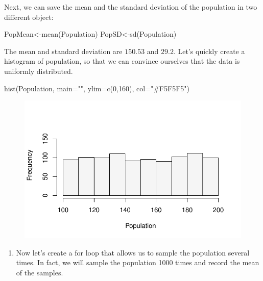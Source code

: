 \documentclass[
  letterpaper,
  DIV=11,
  numbers=noendperiod]{scrreprt}
\newenvironment{Shaded}{\begin{snugshade}}{\end{snugshade}}
\newcommand{\AttributeTok}[1]{\textcolor[rgb]{0.40,0.45,0.13}{#1}}
\newcommand{\DecValTok}[1]{\textcolor[rgb]{0.68,0.00,0.00}{#1}}
\newcommand{\FunctionTok}[1]{\textcolor[rgb]{0.28,0.35,0.67}{#1}}
\newcommand{\NormalTok}[1]{\textcolor[rgb]{0.00,0.23,0.31}{#1}}
\newcommand{\OtherTok}[1]{\textcolor[rgb]{0.00,0.23,0.31}{#1}}
\newcommand{\StringTok}[1]{\textcolor[rgb]{0.13,0.47,0.30}{#1}}
\providecommand{\tightlist}{%
  \setlength{\itemsep}{0pt}\setlength{\parskip}{0pt}}\usepackage{longtable,booktabs,array}
\begin{document}
Next, we can save the mean and the standard deviation of the population
in two different object:

\begin{Shaded}
\begin{Highlighting}[numbers=left,,]
\NormalTok{PopMean}\OtherTok{\textless{}{-}}\FunctionTok{mean}\NormalTok{(Population)}
\NormalTok{PopSD}\OtherTok{\textless{}{-}}\FunctionTok{sd}\NormalTok{(Population)}
\end{Highlighting}
\end{Shaded}

The mean and standard deviation are \(150.53\) and \(29.2\). Let's
quickly create a histogram of population, so that we can convince
ourselves that the data is uniformly distributed.

\begin{Shaded}
\begin{Highlighting}[numbers=left,,]
\FunctionTok{hist}\NormalTok{(Population, }\AttributeTok{main=}\StringTok{""}\NormalTok{, }\AttributeTok{ylim=}\FunctionTok{c}\NormalTok{(}\DecValTok{0}\NormalTok{,}\DecValTok{160}\NormalTok{), }\AttributeTok{col=}\StringTok{"\#F5F5F5"}\NormalTok{)}
\end{Highlighting}
\end{Shaded}

\begin{figure}[H]

{\centering \includegraphics{./12-InferenceI_files/figure-pdf/unnamed-chunk-3-1.pdf}

}

\end{figure}

\begin{enumerate}
\def\labelenumi{\arabic{enumi}.}
\setcounter{enumi}{1}
\tightlist
\item
  Now let's create a for loop that allows us to sample the population
  several times. In fact, we will sample the population 1000 times and
  record the mean of the samples.
\end{enumerate}
\end{document}
